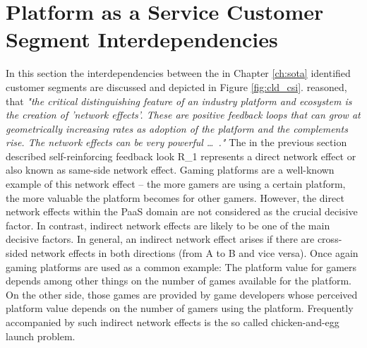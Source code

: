 \section{Platform as a Service Customer Segment Interdependencies}\label{ch:cld:csi}

In this section the interdependencies between the in Chapter \ref{ch:sota} identified customer segments are discussed and depicted in Figure \ref{fig:cld_csi}. \citet[p. 33]{Cusumano2010} reasoned, that \textit{"the critical distinguishing feature of an industry platform and ecosystem is the creation of 'network effects'. These are positive feedback loops that can grow at geometrically increasing rates as adoption of the platform and the complements rise. The network effects can be very powerful \ldots~."} The in the previous section described self-reinforcing feedback look R\_1 represents a direct network effect or also known as same-side network effect. Gaming platforms are a well-known example of this network effect -- the more gamers are using a certain platform, the more valuable the platform becomes for other gamers. However, the direct network effects within the \ac{PaaS} domain are not considered as the crucial decisive factor. In contrast, indirect network effects are likely to be one of the main decisive factors. In general, an indirect network effect arises if there are cross-sided network effects in both directions (from A to B and vice versa). Once again gaming platforms are used as a common example: The platform value for gamers depends among other things on the number of games available for the platform. On the other side, those games are provided by game developers whose perceived platform value depends on the number of gamers using the platform. Frequently accompanied by such indirect network effects is the so called chicken-and-egg launch problem. 

